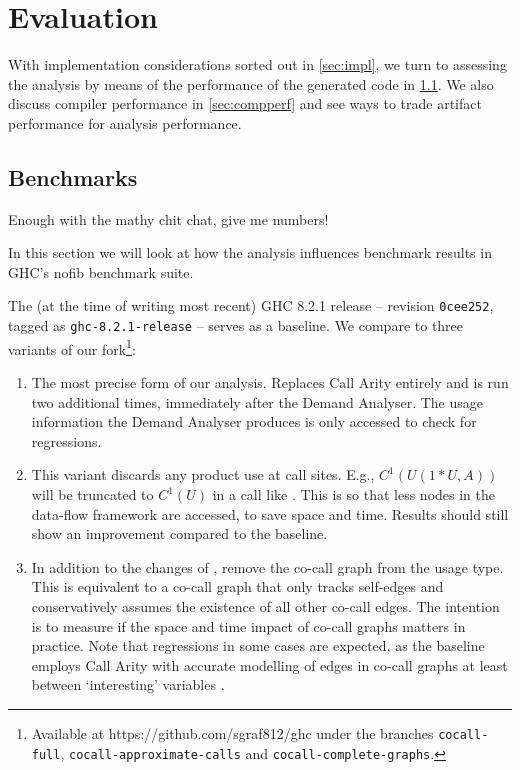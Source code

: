 \chapter{Evaluation}\label{sec:eval}

With implementation considerations sorted out in \cref{sec:impl}, we turn to assessing the analysis by means of the performance of the generated code in \cref{sec:bench}.
We also discuss compiler performance in \cref{sec:compperf} and see ways to trade artifact performance for analysis performance.

\section{Benchmarks}\label{sec:bench}

Enough with the mathy chit chat, give me numbers!

In this section we will look at how the analysis influences benchmark results in GHC's nofib \parencite{nofib} benchmark suite.

The (at the time of writing most recent) GHC 8.2.1 release -- revision \texttt{0cee252}, tagged as \texttt{ghc-8.2.1-release} -- serves as a baseline. We compare to three variants of our fork\footnote{Available at https://github.com/sgraf812/ghc under the branches \texttt{cocall-full}, \texttt{cocall-approximate-calls} and \texttt{cocall-complete-graphs}.}:

\begin{enumerate}
  \item[\varfull] 
    The most precise form of our analysis. 
    Replaces Call Arity entirely and is run two additional times, immediately after the Demand Analyser. 
    The usage information the Demand Analyser produces is only accessed to check for regressions.
  \item[\varcalls]
    This variant discards any product use at call sites. 
    E.g., $C^1(U(1*U,A))$ will be truncated to $C^1(U)$ in a call like . 
    This is so that less nodes in the data-flow framework are accessed, to save space and time.
    Results should still show an improvement compared to the baseline.
  \item[\varedges]
    In addition to the changes of \varcalls, remove the co-call graph from the usage type. 
    This is equivalent to a co-call graph that only tracks self-edges and conservatively assumes the existence of all other co-call edges.
    The intention is to measure if the space and time impact of co-call graphs matters in practice.
    Note that regressions in some cases are expected, as the baseline employs Call Arity with accurate modelling of edges in co-call graphs at least between `interesting' variables \parencite[Section~3.4.1]{callarity}.
\end{enumerate}

